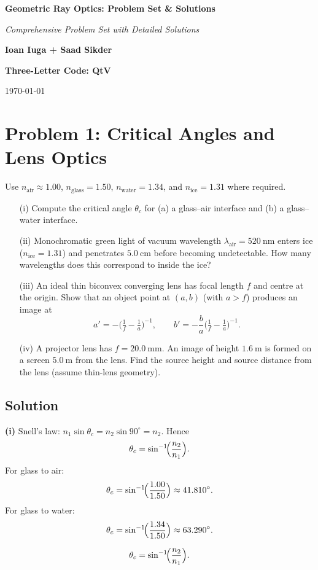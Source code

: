 \documentclass[12pt,a4paper]{article}
\newcommand{\bluebox}[1]{\begin{tcolorbox}#1\end{tcolorbox}}
\newcommand{\n}{\ensuremath{n}}
\newcommand{\air}{\text{air}}
\newcommand{\glass}{\text{glass}}
\newcommand{\water}{\text{water}}
\newcommand{\ice}{\text{ice}}
\begin{document}
\begin{titlepage}
    \centering
    \vspace*{3cm}
    {\Huge \textbf{Geometric Ray Optics: Problem Set \& Solutions}\par}
    \vspace{1cm}
    {\Large \textit{Comprehensive Problem Set with Detailed Solutions}\par}
    \vspace{2cm}
    {\Large \textbf{Ioan Iuga + Saad Sikder}\par}
    {\Large \textbf{Three-Letter Code: QtV}\par}
    \vfill
    {\large \today\par}
\end{titlepage}

\tableofcontents

\section{Problem 1: Critical Angles and Lens Optics}
Use $\n_{\air}\approx1.00$, $\n_{\glass}=1.50$, $\n_{\water}=1.34$, and $\n_{\ice}=1.31$ where required.
\begin{enumerate}[leftmargin=*]
  \item[(i)] Compute the critical angle $\theta_c$ for (a) a glass--air interface and (b) a glass--water interface.
  \item[(ii)] Monochromatic green light of vacuum wavelength $\lambda_{\text{air}}=520\ \mathrm{nm}$ enters ice ($\n_{\ice}=1.31$) and penetrates $5.0\ \mathrm{cm}$ before becoming undetectable. How many wavelengths does this correspond to inside the ice?
  \item[(iii)] An ideal thin biconvex converging lens has focal length $f$ and centre at the origin. Show that an object point at $(a,b)$ (with $a>f$) produces an image at
  \[
    a' = -\bigl(\tfrac{1}{f}-\tfrac{1}{a}\bigr)^{-1},\qquad
    b' = -\frac{b}{a}\bigl(\tfrac{1}{f}-\tfrac{1}{a}\bigr)^{-1}.
  \]
  \item[(iv)] A projector lens has $f=20.0\ \mathrm{mm}$. An image of height $1.6\ \mathrm{m}$ is formed on a screen $5.0\ \mathrm{m}$ from the lens. Find the source height and source distance from the lens (assume thin-lens geometry).
\end{enumerate}

\subsection*{Solution}
\textbf{(i)} Snell's law: $\n_1\sin\theta_c=\n_2\sin 90^\circ=\n_2$. Hence
\[
\theta_c=\sin^{-1}\!\Bigl(\frac{\n_2}{\n_1}\Bigr).
\]
For glass to air:
\[
\theta_c=\sin^{-1}\!\Bigl(\frac{1.00}{1.50}\Bigr)\approx 41.810^\circ.
\]
For glass to water:
\[
\theta_c=\sin^{-1}\!\Bigl(\frac{1.34}{1.50}\Bigr)\approx 63.290^\circ.
\]
\bluebox{\[
\theta_c=\sin^{-1}\!\Bigl(\frac{\n_2}{\n_1}\Bigr).
\]}
\end{document}
